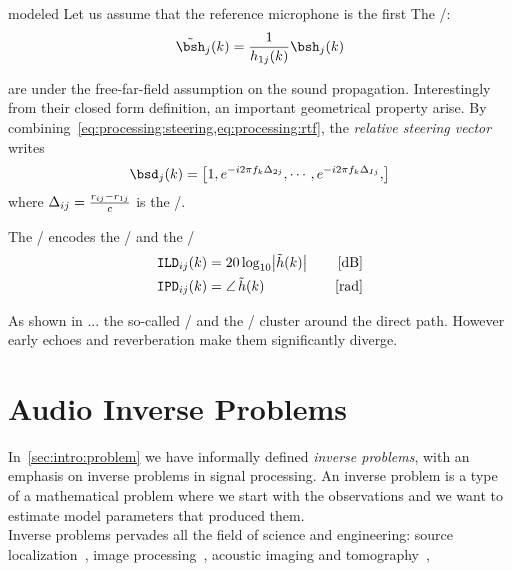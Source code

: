  modeled
Let us assume that the reference microphone is the first
The \RTFdef/:
\begin{equation}\label{eq:processing:rtf}
    \rtfs_j(k) = \frac{1}{\rir_{1j}(k)} \rirs_j(k)
\end{equation}

 are under the free-far-field assumption on the sound propagation.
Interestingly from their closed form definition, an important geometrical property arise.
By combining~\cref{eq:processing:steering,eq:processing:rtf}, the \textit{relative steering vector} writes
\begin{equation}
    \bsd_{j}(k) = \klist{1,
                         \cste^{-\csti 2 \pi f_k \deltaTaus_{2j}},
                         \cdots,
                         \cste^{-\csti 2 \pi f_k \deltaTaus_{Ij}},
                    }
\end{equation}
where $\Delta_{ij} = \frac{r_{ij}-r_{1j}}{c}$ is the \TDOAdef/.

The \RTFs/ encodes the \ILDdef/ and the \IPDdef/
\begin{align}
    \ild_{ij}(k) &= 20 \log_{10} \magnitudeOf{\rtf(k)} \mathspace & [\si{\dB}]\\
    \ipd_{ij}(k) &= \phaseOf{\rtf(k)} \mathspace                  & [\si{\radian}]
\end{align}

As shown in ... the so-called \ILD/ and the \IPD/ cluster around the direct path. However early echoes and
reverberation make them significantly diverge.


\section{Audio Inverse Problems}
\cite{kitic2015cosparse}
In~\cref{sec:intro:problem} we have informally defined \textit{inverse problems}, with an emphasis on inverse problems in signal processing.
An inverse problem is a type of a mathematical problem where we start with the observations and we want to estimate model parameters that produced them.
\\Inverse problems pervades all the field of science and engineering:
source localization~\cite{},
image processing~\cite{},
acoustic imaging and tomography~\cite{},

